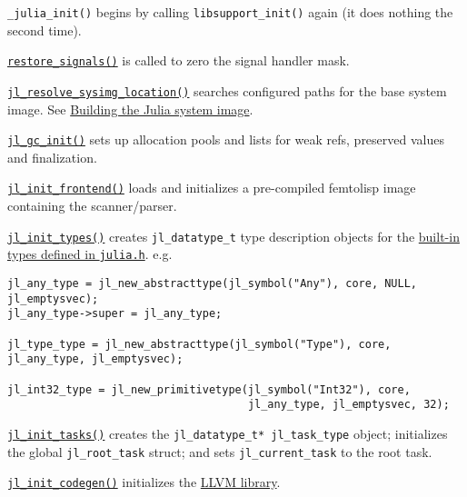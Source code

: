\texttt{\_julia\_init()} begins by calling \texttt{libsupport\_init()} again (it does nothing the second time).



\href{https://github.com/JuliaLang/julia/blob/master/src/signals-unix.c}{\texttt{restore\_signals()}} is called to zero the signal handler mask.



\href{https://github.com/JuliaLang/julia/blob/master/src/init.c}{\texttt{jl\_resolve\_sysimg\_location()}} searches configured paths for the base system image. See \hyperlink{15513456349900674098}{Building the Julia system image}.



\href{https://github.com/JuliaLang/julia/blob/master/src/gc.c}{\texttt{jl\_gc\_init()}} sets up allocation pools and lists for weak refs, preserved values and finalization.



\href{https://github.com/JuliaLang/julia/blob/master/src/ast.c}{\texttt{jl\_init\_frontend()}} loads and initializes a pre-compiled femtolisp image containing the scanner/parser.



\href{https://github.com/JuliaLang/julia/blob/master/src/jltypes.c}{\texttt{jl\_init\_types()}} creates \texttt{jl\_datatype\_t} type description objects for the \href{https://github.com/JuliaLang/julia/blob/master/src/julia.h}{built-in types defined in \texttt{julia.h}}. e.g.




\begin{lstlisting}
jl_any_type = jl_new_abstracttype(jl_symbol("Any"), core, NULL, jl_emptysvec);
jl_any_type->super = jl_any_type;

jl_type_type = jl_new_abstracttype(jl_symbol("Type"), core, jl_any_type, jl_emptysvec);

jl_int32_type = jl_new_primitivetype(jl_symbol("Int32"), core,
                                     jl_any_type, jl_emptysvec, 32);
\end{lstlisting}



\href{https://github.com/JuliaLang/julia/blob/master/src/task.c}{\texttt{jl\_init\_tasks()}} creates the \texttt{jl\_datatype\_t* jl\_task\_type} object; initializes the global \texttt{jl\_root\_task} struct; and sets \texttt{jl\_current\_task} to the root task.



\href{https://github.com/JuliaLang/julia/blob/master/src/codegen.cpp}{\texttt{jl\_init\_codegen()}} initializes the \href{http://llvm.org}{LLVM library}.



